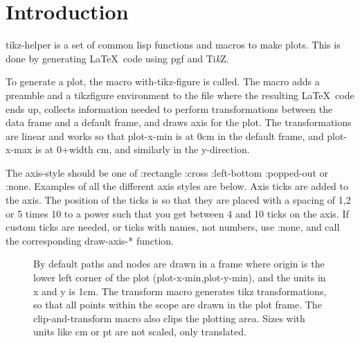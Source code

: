 \documentclass{article}
\begin{document}
\section{Introduction}
tikz-helper is a set of common lisp functions and macros to make plots. This is done by 
generating \LaTeX \ code using pgf and {Ti\textit{k}Z}.

To generate a plot, the macro with-tikz-figure is called. The macro adds a preamble and a 
tikzfigure environment to the file where the resulting \LaTeX \ code ends up, collects information needed to perform 
transformations between the data frame and a default frame, and draws axis for the plot. The transformations are
linear and works so that plot-x-min is at 0cm in the default frame, and plot-x-max is at 0+width cm, 
and similarly in the y-direction.

The axis-style should be one of :rectangle :cross :left-bottom :popped-out or :none.
Examples of all the different axis styles are below. Axis ticks are added to the axis. The position of the ticks is so
that they are placed with a spacing of 1,2 or 5 times 10 to a power such that you get between 4 and 10 ticks on the 
axis. If custom ticks are needed, or ticks with names, not numbers, use :none, and call the corresponding draw-axis-*
function.

\begin{figure}[H]
\centering

\caption{By default paths and nodes are drawn in a frame where origin is the lower left corner of the plot (plot-x-min,plot-y-min), 
and the units in x and y is 1cm. The transform macro generates tikz transformations, so that all points
within the scope are drawn in the plot frame. The clip-and-transform macro also clips the plotting area. Sizes with units like cm
or pt are not scaled, only translated.}
\end{figure}
\end{document}
